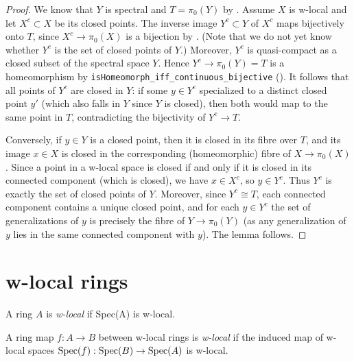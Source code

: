 \begin{proof}
  We know that $Y$ is spectral and $T = \pi_0(Y)$ by . Assume $X$ is w-local and let $X^c \subset X$ be its closed points. The inverse image $Y^c \subset Y$ of $X^c$ maps bijectively onto $T$, since $X^c \to \pi_0(X)$ is a bijection by . (Note that we do not yet know whether $Y^c$ is the set of closed points of $Y$.) Moreover, $Y^c$ is quasi-compact as a closed subset of the spectral space $Y$. Hence $Y^c \to \pi_0(Y) = T$ is a homeomorphism by \verb`isHomeomorph_iff_continuous_bijective` (). It follows that all points of $Y^c$ are closed in $Y$: if some $y \in Y^c$ specialized to a distinct closed point $y'$ (which also falls in $Y$ since $Y$ is closed), then both would map to the same point in $T$, contradicting the bijectivity of $Y^c \to T$.

  Conversely, if $y \in Y$ is a closed point, then it is closed in its fibre over $T$, and its image $x \in X$ is closed in the corresponding (homeomorphic) fibre of $X \to \pi_0(X)$. Since a point in a w-local space is closed if and only if it is closed in its connected component (which is closed), we have $x \in X^c$, so $y \in Y^c$. Thus $Y^c$ is exactly the set of closed points of $Y$. Moreover, since $Y^c \cong T$, each connected component contains a unique closed point, and for each $y \in Y^c$ the set of generalizations of $y$ is precisely the fibre of $Y \to \pi_0(Y)$ (as any generalization of $y$ lies in the same connected component with $y$). The lemma follows.
\end{proof}

\section{w-local rings}

\begin{definition}
    A ring \(A\) is \emph{w-local} if Spec(A) is w-local.
    \label{def:w-local-ring}
    \leanok
\end{definition}

\begin{definition}
    A ring map \(f: A \to B\) between w-local rings is \emph{w-local} if the induced map of w-local spaces \(\operatorname{Spec}(f) : \operatorname{Spec}(B) \to \operatorname{Spec}(A)\) is w-local.
    \label{def:w-local-ring-map}
\end{definition}

